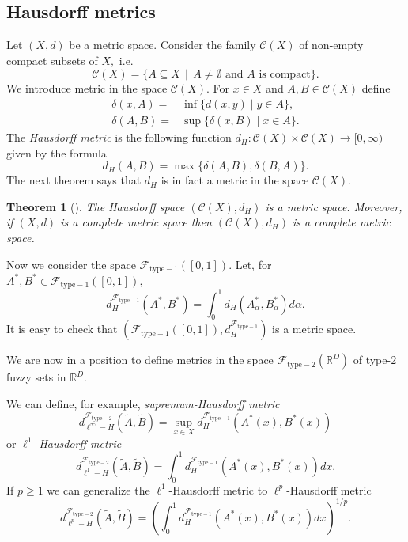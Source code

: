 \documentclass[leqno,12pt]{amsart}
\newcommand{\R}{\mathbb{R}}
\newtheorem{theorem}{Theorem}[section]
\theoremstyle{remark}
\theoremstyle{remark}
\theoremstyle{remark}
\theoremstyle{definition}
\numberwithin{equation}{section}
\begin{document}
\subsection{Hausdorff metrics}
Let $(X,d)$ be a metric space. Consider the family $\mathcal C(X)$ of non-empty compact subsets of $X,$ i.e.
$$\mathcal C(X)=\{A\subseteq X\,\mid\,A\not=\emptyset\text{ and $A$ is compact}\}.$$
We introduce metric in the space $\mathcal C(X).$
For $x\in X$ and $A,B\in\mathcal C(X)$ define
\begin{equation*}
\begin{split}
\delta(x,A)=&\inf\{d(x,y)\mid y\in A\},\\
\delta(A,B)=&\sup\{\delta(x,B)\mid x\in A\}.
\end{split}
\end{equation*}
The {\em Hausdorff metric} is the following function $d_H:\mathcal C(X)\times\mathcal C(X)\to[0,\infty)$ given by the formula
\begin{equation*}
d_H(A,B)=\max\{\delta(A,B),\delta(B,A)\}.
\end{equation*}
The next theorem says that $d_H$ is in fact a metric in the space $\mathcal C(X).$
\begin{theorem}[{\cite[Proposition 1.1.5]{Fractals}}]\label{H}
The {\em Hausdorff} space $(\mathcal C(X),d_H)$ is a metric space. Moreover, if $(X,d)$ is a complete metric space then $(\mathcal C(X),d_H)$ is a complete metric space.
\end{theorem}
Now we consider the space $\mathcal F_{\mathrm{type-1}}([0,1])$. Let, for $A^*,B^*\in\mathcal F_{\mathrm{type-1}}([0,1]),$
$$d_H^{\mathcal F_{\mathrm{type-1}}}(A^*,B^*)=\int_0^1d_H(A_\alpha^*,B_\alpha^*)d\alpha.$$
It is easy to check that $(\mathcal F_{\mathrm{type-1}}([0,1]),d_H^{\mathcal F_{\mathrm{type-1}}})$ is a metric space.
\par
We are now in a position to define metrics in the space $\mathcal F_{\mathrm{type-2}}(\R^D)$ of type-2 fuzzy sets in $\R^D.$
\par
We can define, for example, {\em supremum-Hausdorff metric}
$$d^{\mathcal F_{\mathrm{type-2}}}_{\ell^\infty-H}(\tilde A,\tilde B)=\sup_{x\in X}d_H^{\mathcal F_{\mathrm{type-1}}}(A^*(x),B^*(x))$$
or {\em $\ell^1$-Hausdorff metric}
$$d^{\mathcal F_{\mathrm{type-2}}}_{\ell^1-H}(\tilde A,\tilde B)=\int_0^1d_H^{\mathcal F_{\mathrm{type-1}}}(A^*(x),B^*(x))dx.$$
If $p\geq 1$ we can generalize the $\ell^1 $-Hausdorff metric to $\ell^p$-Hausdorff metric
$$d^{\mathcal F_{\mathrm{type-2}}}_{\ell^p-H}(\tilde A,\tilde B)=\left(\int_0^1d_H^{\mathcal F_{\mathrm{type-1}}}(A^*(x),B^*(x))dx\right)^{1\slash p}.$$
\end{document}
